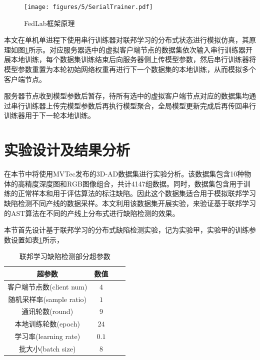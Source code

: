 \begin{figure}[htbp]
  \centering
  \texttt{[image: figures/5/SerialTrainer.pdf]}
  \caption{FedLab框架原理}\label{fig:fedlab-SerialTrainer}
\end{figure}
本文在单机单进程下使用串行训练器对联邦学习的分布式状态进行模拟仿真，其原理如图\ref{fig:fedlab-SerialTrainer}所示。对应服务器选中的虚拟客户端节点的数据集依次输入串行训练器开展本地训练，每个数据集训练结束后向服务器侧上传模型参数，然后串行训练器将模型参数重置为本轮初始网络权重再进行下一个数据集的本地训练，从而模拟多个客户端节点。


服务器节点收到模型参数后暂存，待所有选中的虚拟客户端节点对应的数据集均通过串行训练器上传完模型参数后再执行模型聚合，全局模型更新完成后再传回串行训练器用于下一轮本地训练。

\section{实验设计及结果分析}
在本节中将使用MVTec发布的3D-AD数据集进行实验分析。该数据集包含10种物体的高精度深度图和RGB图像组合，共计4147组数据。同时，数据集包含用于训练的正常样本和用于评估算法的标注缺陷。因此这个数据集适合用于模拟联邦学习缺陷检测不同产线的数据采样。本文利用该数据集开展实验，来验证基于联邦学习的AST算法在不同的产线上分布式进行缺陷检测的效果。

本节首先设计基于联邦学习的分布式缺陷检测实验，记为实验甲，实验甲的训练参数设置如表\ref{tab:ast-fed-category}所示，
\begin{table}[htbp]
  \centering
  \caption{联邦学习缺陷检测部分超参数} \label{tab:ast-fed-category}
  \begin{tabular*}{0.75\textwidth}{@{\extracolsep{\fill}}cccc}
  \toprule
    超参数			&数值		 \\
  \midrule
    客户端节点数(client num) &  $4$    \\
    随机采样率(sample ratio)			&$1$		 \\
    通讯轮数(round)	&$9$	 \\
    本地训练轮数(epoch)	& $24$\\
    学习率(learning rate)	& $0.1$\\
    批大小(batch size)&  $8$    \\
  \bottomrule
  \end{tabular*}
\end{table}


